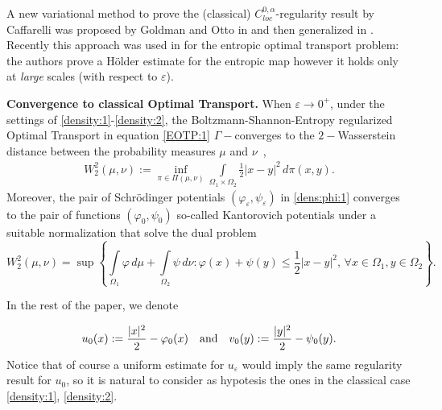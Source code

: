 \documentclass[reqno,12pt]{article}
\newcommand{\I}{\int\limits}
\begin{document}
A new variational method to prove the (classical) $C^{0,\alpha}_{loc}$-regularity result by Caffarelli was proposed by Goldman and Otto in \cite{goldman2019variational} and then generalized in \cite{goldman2021quantitative, otto2021variational}. Recently this approach was used in \cite{gvalani2025} for the entropic optimal transport problem: the authors prove a H\"{o}lder estimate for the entropic map however it holds only at \emph{large} scales (with respect to $\varepsilon$).\vspace{2mm}


\noindent
\textbf{Convergence to classical Optimal Transport.} When $\varepsilon\to0^+$, under the settings of \eqref{density:1}-\eqref{density:2}, the  Boltzmann-Shannon-Entropy regularized Optimal Transport in equation \eqref{EOTP:1}  $\Gamma-$converges to the $2-$Wasserstein distance between the probability measures $\mu$ and $\nu$~\cite{CarDuvPeySch17,LeoGamma},
\begin{align}
    \label{intro:W2}
    W_2^2(\mu,\nu) := \inf\limits_{\pi \in \Pi(\mu,\nu)}\I_{\Omega_{1}\times\Omega_{2}} \frac{1}{2} |x-y|^2\,d\pi(x,y).
\end{align}
Moreover, the pair of Schr\"odinger potentials $(\varphi_{\varepsilon},\psi_{\varepsilon})$ in \eqref{dens:phi:1} converges to the pair of functions $(\varphi_0,\psi_0)$ so-called Kantorovich potentials  under a suitable normalization that solve the dual problem~\cite{NW1,Fig17}
\begin{equation}\label{OTP:2}
    W_2^2(\mu,\nu)=
     \sup
    \left\{ \I_{\Omega_{1}}\varphi\,d\mu + \I_{\Omega_{2}}\psi\,d\nu :
\varphi(x) + \psi(y) \leqslant \frac{1}{2}|x-y|^2, \, \forall x\in\Omega_{1},y\in\Omega_{2} \right\}.
\end{equation}

In the rest of the paper, we denote

\begin{equation}
    \label{Kant_poten}
    u_{0}(x):= \frac{|x|^2}{2}-\varphi_0(x)\quad \text{and}\quad
    v_0(y):= \frac{|y|^2}{2}-\psi_{0}(y).\vspace{5mm}
\end{equation}
Notice that of course a uniform estimate for $u_{\varepsilon}$ would imply the same regularity result for $u_0$, so it is natural to consider as hypotesis the ones in the classical case \eqref{density:1}, \eqref{density:2}.
\end{document}
